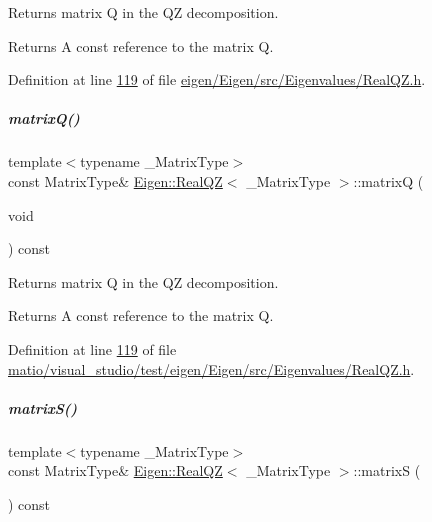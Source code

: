 Returns matrix Q in the QZ decomposition. 

\begin{DoxyReturn}{Returns}
A const reference to the matrix Q. 
\end{DoxyReturn}


Definition at line \hyperlink{eigen_2_eigen_2src_2_eigenvalues_2_real_q_z_8h_source_l00119}{119} of file \hyperlink{eigen_2_eigen_2src_2_eigenvalues_2_real_q_z_8h_source}{eigen/\+Eigen/src/\+Eigenvalues/\+Real\+Q\+Z.\+h}.

\mbox{\label{group___eigenvalues___module_a212bc2f69ea4eff830fde70e209e40fb}} 
\subparagraph{\texorpdfstring{matrix\+Q()}{matrixQ()}\hspace{0.1cm}{\footnotesize\ttfamily [2/2]}}
{\footnotesize\ttfamily template$<$typename \+\_\+\+Matrix\+Type$>$ \\
const Matrix\+Type\& \hyperlink{group___eigenvalues___module_class_eigen_1_1_real_q_z}{Eigen\+::\+Real\+QZ}$<$ \+\_\+\+Matrix\+Type $>$\+::matrixQ (\begin{DoxyParamCaption}\item[{void}]{ }\end{DoxyParamCaption}) const\hspace{0.3cm}{\ttfamily [inline]}}



Returns matrix Q in the QZ decomposition. 

\begin{DoxyReturn}{Returns}
A const reference to the matrix Q. 
\end{DoxyReturn}


Definition at line \hyperlink{matio_2visual__studio_2test_2eigen_2_eigen_2src_2_eigenvalues_2_real_q_z_8h_source_l00119}{119} of file \hyperlink{matio_2visual__studio_2test_2eigen_2_eigen_2src_2_eigenvalues_2_real_q_z_8h_source}{matio/visual\+\_\+studio/test/eigen/\+Eigen/src/\+Eigenvalues/\+Real\+Q\+Z.\+h}.

\mbox{\label{group___eigenvalues___module_ad24d7bf534afb55adaef00f00846adaf}} 
\subparagraph{\texorpdfstring{matrix\+S()}{matrixS()}\hspace{0.1cm}{\footnotesize\ttfamily [1/2]}}
{\footnotesize\ttfamily template$<$typename \+\_\+\+Matrix\+Type$>$ \\
const Matrix\+Type\& \hyperlink{group___eigenvalues___module_class_eigen_1_1_real_q_z}{Eigen\+::\+Real\+QZ}$<$ \+\_\+\+Matrix\+Type $>$\+::matrixS (\begin{DoxyParamCaption}{ }\end{DoxyParamCaption}) const\hspace{0.3cm}{\ttfamily [inline]}}



